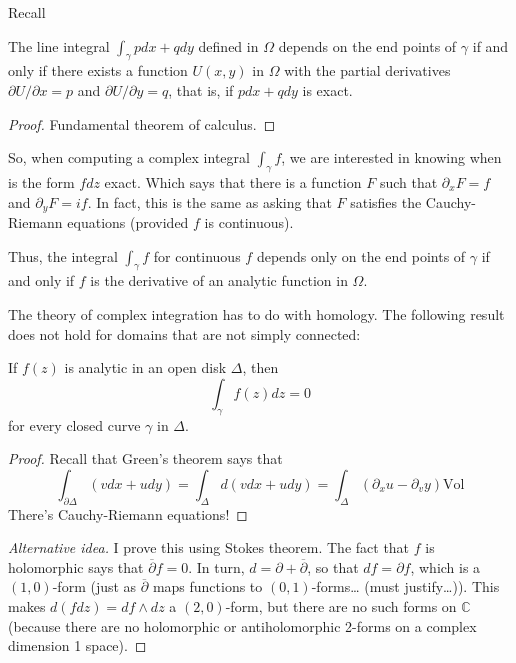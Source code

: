 Recall
\begin{theorem}[Stokes]
\label{theorem-Stokes}
\begin{reference}
\cite[Chapter 4, Theorem 1]{ahl}
\end{reference}
The line integral $\int_\gamma p dx +q dy$ defined in $\Omega$ depends on the
end points of $\gamma$ if and only if there exists a function $U(x,y)$ in
$\Omega$ with the partial derivatives $\partial U/\partial x=p$ and 
$\partial U/\partial y=q$, that is, if $pdx +qdy$ is exact.
\end{theorem}

\begin{proof}
Fundamental theorem of calculus.
\end{proof}
So, when computing a complex integral $\int_\gamma f$, we are interested in
knowing when is the form $fdz$ exact. Which says that there is a function $F$
such that $\partial_x F=f$ and $\partial_y F=if$. In fact, this is the same as
asking that $F$ satisfies the Cauchy-Riemann equations (provided $f$ is
continuous).

Thus, the integral $\int_\gamma f$ for continuous $f$ depends only on the end
points of $\gamma$ if and only if $f$ is the derivative of an analytic function
in $\Omega$.

\medskip\noindent

The theory of complex integration has to do with homology. The following
result does not hold for domains that are not simply connected:

\begin{theorem}[Cauchy]
\label{theorem-Cauchy}
If $f(z)$ is analytic in an open disk $\Delta$, then
\begin{equation}
\label{equation-Cauchy-theorem}
\int_\gamma f(z)dz=0
\end{equation}
for every closed curve $\gamma$ in $\Delta$.
\end{theorem}

\begin{proof}
Recall that Green's theorem says that
$$
\int_{\partial\Delta}(vdx+udy)=\int_\Delta d(vdx+udy)
=\int_\Delta(\partial_xu-\partial_vy)\text{Vol}
$$
There's Cauchy-Riemann equations!
\end{proof}

\begin{proof}[Alternative idea]
I prove this using Stokes theorem. The fact that $f$ is holomorphic says that
$\overline{\partial}f=0$. In turn, $d=\partial+\overline{\partial}$, so that
$df=\partial f$, which is a $(1,0)$-form (just as $\overline{\partial}$ maps
functions to $(0,1)$-forms… (must justify…)). This makes $d(fdz)=df\wedge dz$ a
$(2,0)$-form, but there are no such forms on $\mathbb{C}$ (because there are no
holomorphic or antiholomorphic 2-forms on a complex dimension 1 space).
\end{proof}

